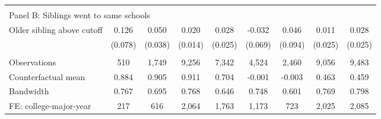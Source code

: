 {{\begin{tabular}{lcccccccc}
&  &  &  & & & & & &    \\
\multicolumn{9}{l}{Panel B: Siblings went to same schools} \\
Older sibling above cutoff&       0.126   &       0.050   &       0.020   &       0.028   &      -0.032   &       0.046   &       0.011   &       0.028   \\
                    &     (0.078)   &     (0.038)   &     (0.014)   &     (0.025)   &     (0.069)   &     (0.094)   &     (0.025)   &     (0.025)   \\
                    &               &               &               &               &               &               &               &               \\
Observations        &         510   &       1,749   &       9,256   &       7,342   &       4,524   &       2,460   &       9,056   &       9,483   \\
Counterfactual mean &       0.884   &       0.905   &       0.911   &       0.704   &      -0.001   &      -0.003   &       0.463   &       0.459   \\
Bandwidth           &       0.767   &       0.695   &       0.768   &       0.646   &       0.748   &       0.601   &       0.769   &       0.798   \\
FE: college-major-year&         217   &         616   &       2,064   &       1,763   &       1,173   &         723   &       2,025   &       2,085   \\
 

\bottomrule
\end{tabular}
}
}
